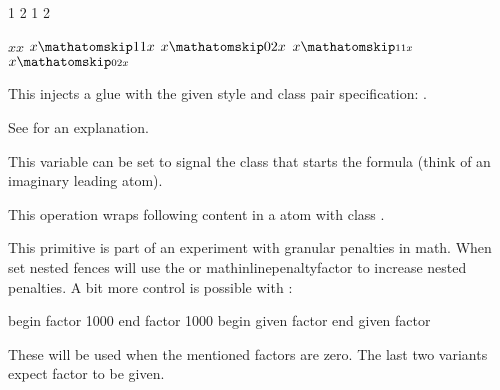\startbuffer
\the\mathatomglue {} 1
\the\mathatomglue {} 2
\the\mathatomglue {} 1
\the\mathatomglue {} 2
\stopbuffer

\typebuffer

\startlines \tttf
\getbuffer
\stoplines

\stopnewprimitive

\startnewprimitive[title={\prm {mathatomskip}}]

\startbuffer
$x x$
$x \mathatomskip \textstyle   1 1 x$
$x \mathatomskip \textstyle   0 2 x$
$x \mathatomskip \scriptstyle 1 1 x$
$x \mathatomskip \scriptstyle 0 2 x$
\stopbuffer

This injects a glue with the given style and class pair specification:
\inlinebuffer.

\typebuffer


\stopnewprimitive

\startnewprimitive[title={\prm {mathbackwardpenalties}}]

See  for an explanation.

\stopnewprimitive

\startnewprimitive[title={\prm {mathbeginclass}}]

This variable can be set to signal the class that starts the formula (think of an
imaginary leading atom).

\stopnewprimitive

\startoldprimitive[title={\prm {mathbin}}]

This operation wraps following content in a atom with class .

\stopoldprimitive

\startnewprimitive[title={\prm {mathboundary}}]

This primitive is part of an experiment with granular penalties in math. When set
nested fences will use the  or \prm
{mathinlinepenaltyfactor} to increase nested penalties. A bit more control is
possible with :

\starttabulate[||||]
 \NC begin \NC factor 1000  \NC \NR
{} \NC end   \NC factor 1000  \NC \NR
{} \NC begin \NC given factor \NC \NR
{} \NC end   \NC given factor \NC \NR
\stoptabulate

These will be used when the mentioned factors are zero. The last two variants
expect factor to be given.

\stopnewprimitive

\startoldprimitive[title={\prm {mathchar}}][obsolete=yes]

